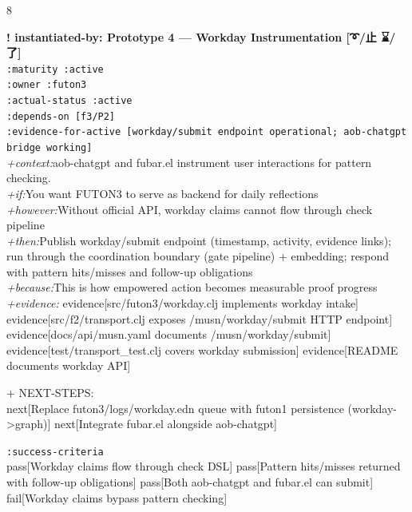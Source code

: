 \documentclass[landscape]{article}
\newcommand{\flexitag}[1]{\textcolor[gray]{0.35}{\textit{#1}}}
\newenvironment{devmapactive}{%
  \def\FrameCommand{\colorbox{devmapactivebg}}%
  \setlength{\fboxsep}{2pt}%
  \MakeFramed{\advance\hsize-\width \FrameRestore}%
}{\endMakeFramed}
\begin{document}
\begin{paracol}{8}
\begin{devmapactive}
\par
\end{devmapactive}
\begin{devmapactive}
\textbf{! instantiated-by: Prototype 4 — Workday Instrumentation [➰/止 ⌛️/了]}\\
  \texttt{:\allowbreak{}maturity :\allowbreak{}active}\\
  \texttt{:\allowbreak{}owner :\allowbreak{}futon3}\\
  \texttt{:\allowbreak{}actual-\allowbreak{}status :\allowbreak{}active}\\
  \texttt{:\allowbreak{}depends-\allowbreak{}on [f3/\allowbreak{}P2]}\\
  \texttt{:\allowbreak{}evidence-\allowbreak{}for-\allowbreak{}active [workday/\allowbreak{}submit endpoint operational;\allowbreak{} aob-\allowbreak{}chatgpt bridge working]}\\
  \flexitag{+context:}aob-chatgpt and fubar.el instrument user interactions for pattern checking.\\
  \flexitag{+if:}You want FUTON3 to serve as backend for daily reflections\\
  \flexitag{+however:}Without official API, workday claims cannot flow through check pipeline\\
  \flexitag{+then:}Publish workday/submit endpoint (timestamp, activity, evidence links); run through the coordination boundary (gate pipeline) + embedding; respond with pattern hits/misses and follow-up obligations\\
  \flexitag{+because:}This is how empowered action becomes measurable proof progress\\
  \flexitag{+evidence:} evidence[src/futon3/workday.clj implements workday intake] evidence[src/f2/transport.clj exposes /musn/workday/submit HTTP endpoint] evidence[docs/api/musn.yaml documents /musn/workday/submit] evidence[test/transport\_test.clj covers workday submission] evidence[README documents workday API]\\
\par
  + NEXT-STEPS:\\
    next[Replace futon3/logs/workday.edn queue with futon1 persistence (workday->graph)] next[Integrate fubar.el alongside aob-chatgpt]\\
\par
  \texttt{:\allowbreak{}success-\allowbreak{}criteria}\\
    pass[Workday claims flow through check DSL] pass[Pattern hits/misses returned with follow-up obligations] pass[Both aob-chatgpt and fubar.el can submit] fail[Workday claims bypass pattern checking]\\

\end{devmapactive}
\end{paracol}
\end{document}
